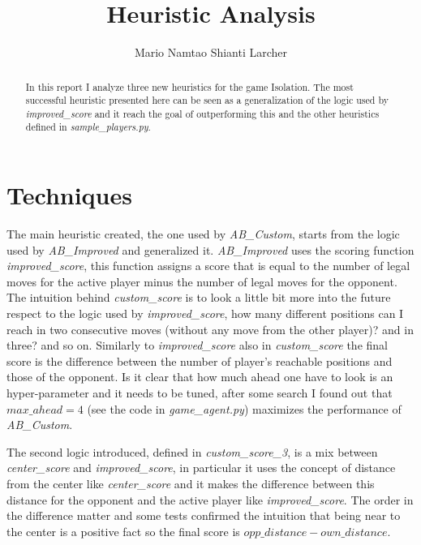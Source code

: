 \documentclass[10pt,a4paper]{article}
\begin{document}
\title{Heuristic Analysis}
\author{Mario Namtao Shianti Larcher}

\maketitle

\begin{abstract}

In this report I analyze three new heuristics for the game Isolation. 
The most successful heuristic presented here  can be seen as a generalization of the logic used by \textit{improved\_score} and it reach the goal of outperforming this and the other heuristics defined in \textit{sample\_players.py}.

\end{abstract}

\section{Techniques}

The main heuristic created, the one used by \textit{AB\_Custom}, starts from the logic used by  \textit{AB\_Improved} and generalized it.
\textit{AB\_Improved} uses the scoring function \textit{improved\_score}, this function assigns a score that is equal to the number of legal moves for the active player minus the number of legal moves for the opponent. 
The intuition behind \textit{custom\_score} is to look a little bit more into the future respect to the logic used by \textit{improved\_score}, how many different positions can I reach in two consecutive moves (without any move from the other player)? and in three? and so on. 
Similarly to \textit{improved\_score} also in \textit{custom\_score} the final score is the difference between the number of player's reachable positions and those of the opponent. Is it clear that how much ahead one have to look is an hyper-parameter and it needs to be tuned, after some search I found out that $max\_ahead=4$ (see the code in \textit{game\_agent.py}) maximizes the performance of \textit{AB\_Custom}.

The second logic introduced, defined in \textit{custom\_score\_3}, is a mix between \textit{center\_score} and \textit{improved\_score}, in particular it uses the concept of distance from the center like \textit{center\_score} and it makes the difference between this distance for the opponent and the active player like \textit{improved\_score}. 
The order in the difference matter and some tests confirmed the intuition that being near to the center is a positive fact so the final score is $opp\_distance - own\_distance$.
\end{document}
